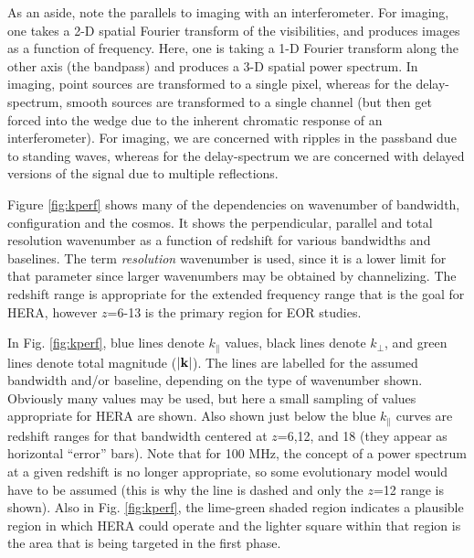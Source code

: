 \documentclass[preprint,11pt]{aastex}
\newcommand{\kvec}{{\bf k}}
\newcommand{\kpr}{{k_\perp}}
\def\kpar{k_{\|}}
\begin{document}
As an aside, note the parallels to imaging with an interferometer.  For imaging, one takes a 2-D spatial Fourier transform of the visibilities, and produces images as a function of frequency.  Here, one is taking a 1-D Fourier transform along the other axis (the bandpass) and produces a 3-D spatial power spectrum.  In imaging, point sources are transformed to a single pixel, whereas for the delay-spectrum, smooth sources are transformed to a single channel (but then get forced into the wedge due to the inherent chromatic response of an interferometer).  For imaging, we are concerned with ripples in the passband due to standing waves, whereas for the delay-spectrum we are concerned with delayed versions of the signal due to multiple reflections.

Figure \ref{fig:kperf} shows many of the dependencies on wavenumber of bandwidth, configuration and the cosmos.  It shows the perpendicular, parallel and total resolution wavenumber as a function of redshift for various bandwidths and baselines.  The term {\em resolution} wavenumber is used, since it is a lower limit for that parameter since larger wavenumbers may be obtained by channelizing.  The redshift range is appropriate for the extended frequency range that is the goal for HERA, however $z$=6-13 is the primary region for EOR studies.

In Fig. \ref{fig:kperf}, blue lines denote $\kpar$ values, black lines denote $\kpr$, and green lines denote total magnitude ($|{\kvec}|$).  The lines are labelled for the assumed bandwidth and/or baseline, depending on the type of wavenumber shown.  Obviously many values may be used, but here a small sampling of values appropriate for HERA are shown.    Also shown just below the blue $\kpar$ curves are redshift ranges for that bandwidth centered at $z$=6,12, and 18 (they appear as horizontal ``error'' bars).  Note that for 100 MHz, the concept of a power spectrum at a given redshift is no longer appropriate, so some evolutionary model would have to be assumed (this is why the line is dashed and only the $z$=12 range is shown).
Also in Fig. \ref{fig:kperf}, the lime-green shaded region indicates a plausible region in which HERA could operate and the lighter square within that region is the area that is being targeted in the first phase.
\end{document}
